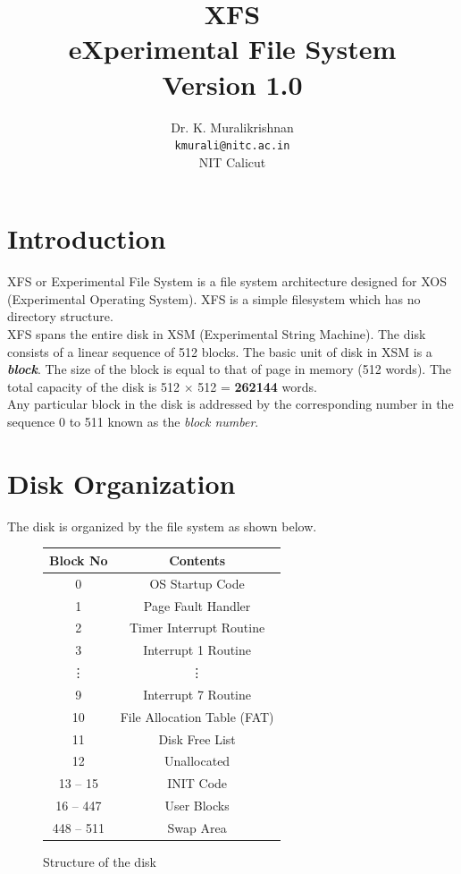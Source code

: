 \documentclass[11pt]{article}
\title{XFS \\ eXperimental File System \\
Version 1.0}
\author{Dr. K. Muralikrishnan  \\ \texttt{kmurali@nitc.ac.in} \\ {NIT Calicut} }
\begin{document}
\maketitle
\pagebreak

\thispagestyle{plain}

\tableofcontents
\pagebreak




\section{Introduction}

XFS or Experimental File System is a file system architecture designed for XOS (Experimental Operating System). XFS is a simple filesystem which has no directory structure. \\

XFS spans the entire disk in XSM (Experimental String Machine). The disk consists of a linear sequence of 512 blocks. The basic unit of disk in XSM is a \textbf{\textit{block}}. The size of the block is equal to that of page in memory (512 words). The total capacity of the disk is 512 $\times$ 512  = \textbf{262144} words. \\

 Any particular block in the disk is addressed by the corresponding number in the sequence 0 to 511 known as the \emph{block number}. 


\section{Disk Organization}
The disk is organized by the file system as shown below. 

\begin{figure}[htp!] \small
	\centering
	\begin{tabular}{|c|c|}
	\toprule
		\textbf{Block No} & \textbf{Contents} \\ \hline
	\toprule
		0 & OS Startup Code \\ \hline
		1 & Page Fault Handler \\ \hline
		2 & Timer Interrupt Routine \\ \hline
		3 & Interrupt 1 Routine \\ \hline 
		\vdots & \vdots \\ 
		9 & Interrupt 7 Routine \\ \hline
		10 & File Allocation Table (FAT) \\ \hline
		11 & Disk Free List \\ \hline
		12 & Unallocated  \\ \hline
		13 -- 15 & INIT Code  \\ \hline
		16 -- 447 & User Blocks  \\ \hline
		448 -- 511 & Swap Area  \\ \hline					
	\end{tabular}
	\caption{Structure of the disk}
	\label{fig:disk}
\end{figure}
\end{document}

